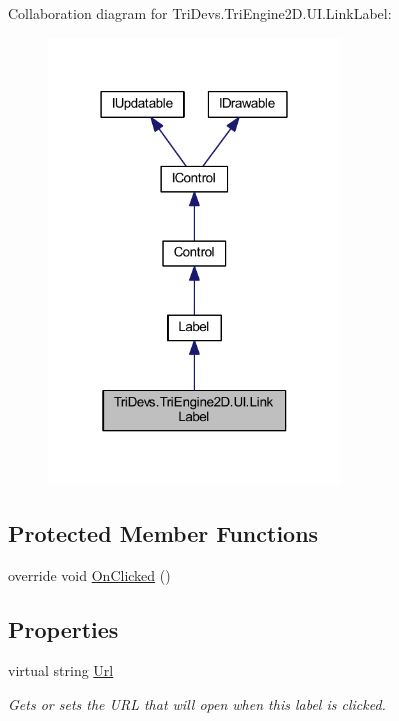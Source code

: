 Collaboration diagram for Tri\-Devs.\-Tri\-Engine2\-D.\-U\-I.\-Link\-Label\-:
\nopagebreak
\begin{figure}[H]
\begin{center}
\leavevmode
\includegraphics[width=219pt]{class_tri_devs_1_1_tri_engine2_d_1_1_u_i_1_1_link_label__coll__graph}
\end{center}
\end{figure}
\subsection*{Protected Member Functions}
\begin{DoxyCompactItemize}
\item 
override void \hyperlink{class_tri_devs_1_1_tri_engine2_d_1_1_u_i_1_1_link_label_adcc511e03ec0c880cdff37947178a756}{On\-Clicked} ()
\end{DoxyCompactItemize}
\subsection*{Properties}
\begin{DoxyCompactItemize}
\item 
virtual string \hyperlink{class_tri_devs_1_1_tri_engine2_d_1_1_u_i_1_1_link_label_a6a4b37c0c7d9910451a8444dfb9853a2}{Url}
\begin{DoxyCompactList}\small\item\em Gets or sets the U\-R\-L that will open when this label is clicked. \end{DoxyCompactList}\end{DoxyCompactItemize}
